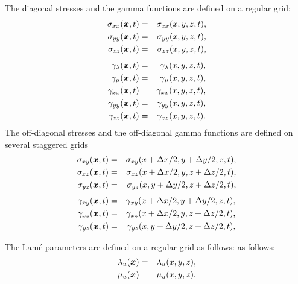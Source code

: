 \documentclass[11pt]{article}
\begin{document}
The diagonal stresses and the gamma functions are defined on a regular grid:
\begin{eqnarray}
  \sigma_{xx}(\mbox{\boldmath $x$}, t) & = & \sigma_{xx}( x, y,z, t), \nonumber\\
  \sigma_{yy}(\mbox{\boldmath $x$}, t) & = & \sigma_{yy}(x, y, z, t), \nonumber\\
  \sigma_{zz}(\mbox{\boldmath $x$}, t) & = & \sigma_{zz}(x, y, z, t), \nonumber \\ 
\end{eqnarray}
\begin{eqnarray}
  \gamma_{\lambda}(\mbox{\boldmath $x$}, t) & = & \gamma_{\lambda}(x, y,  z, t), \\ 
  \gamma_{\mu}(\mbox{\boldmath $x$}, t) & = & \gamma_{\mu}(x, y, z, t),          \\ 
  \gamma_{xx}(\mbox{\boldmath $x$}, t) & = & \gamma_{xx}(x, y, z,  t),           \\ 
  \gamma_{yy}(\mbox{\boldmath $x$}, t) & = & \gamma_{yy}( x, y, z,  t),          \\ 
  \gamma_{zz}(\mbox{\boldmath $x$}, t) & = & \gamma_{zz}(x, y, z,  t). 
\end{eqnarray}
%
The off-diagonal stresses and the off-diagonal gamma functions are defined on
several staggered grids
%
\begin{eqnarray}
  \sigma_{xy}(\mbox{\boldmath $x$}, t) & = & \sigma_{xy}(x +\Delta x/2,  
                                        y + \Delta y/2, z, t), \nonumber\\
  \sigma_{xz}(\mbox{\boldmath $x$}, t) & = & \sigma_{xz}(x +\Delta x/2, y,
                                        z + \Delta z/2,  t),   \nonumber\\
  \sigma_{yz}(\mbox{\boldmath $x$}, t) & = & \sigma_{yz}(x, y + \Delta y/2, 
                                             z+\Delta z/2,  t),\nonumber\\
\end{eqnarray}
\begin{eqnarray}
  \gamma_{xy}(\mbox{\boldmath $x$}, t) & = & \gamma_{xy}(x +\Delta x/2, y 
                                          + \Delta y/2, z, t), \nonumber\\
   \gamma_{xz}(\mbox{\boldmath $x$}, t) & =& \gamma_{xz}(x +\Delta x/2, y,z 
                                          + \Delta z/2,  t),   \nonumber \\
   \gamma_{yz}(\mbox{\boldmath $x$}, t) & = & \gamma_{yz}(x, y + \Delta y/2, 
                                         z+\Delta z/2,  t),    \nonumber \\
\end{eqnarray}
%

The Lam\'{e} parameters are defined on a regular grid as follows:
as follows:
%
\begin{eqnarray}
   \lambda_u(\mbox{\boldmath $x$}) & = & \lambda_u(x,y,z),\\
   \mu_u(\mbox{\boldmath $x$})     & = & \mu_u(x,y, z).
\end{eqnarray}
\end{document}
